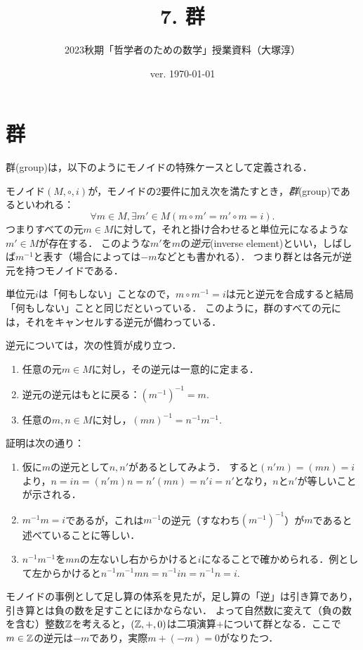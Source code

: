 \documentclass[11pt,a4paper]{jsarticle}
\begin{document}
\title{7. 群}
\author{2023秋期「哲学者のための数学」授業資料（大塚淳）}
\date{ver. \today}
\maketitle



\section{群}
群(group)は，以下のようにモノイドの特殊ケースとして定義される．
\begin{dfn}[群]
    モノイド$(M, \circ, i)$が，モノイドの2要件に加え次を満たすとき，\emph{群}(group)であるといわれる：
    \[ \forall m \in M, \exists m' \in M (m \circ m' = m' \circ m = i).\]
    つまりすべての元$m \in M$に対して，それと掛け合わせると単位元になるような$m' \in M$が存在する．
    このような$m'$を$m$の\emph{逆元}(inverse element)といい，しばしば$m^{-1}$と表す（場合によっては$-m$などとも書かれる）．
    つまり群とは各元が逆元を持つモノイドである．
\end{dfn}    

単位元$i$は「何もしない」ことなので，$m \circ m^{-1} = i$は元と逆元を合成すると結局「何もしない」ことと同じだといっている．
このように，群のすべての元には，それをキャンセルする逆元が備わっている．

逆元については，次の性質が成り立つ．
\begin{enumerate}
    \item 任意の元$m \in M$に対し，その逆元は一意的に定まる．
    \item 逆元の逆元はもとに戻る：$(m^{-1})^{-1}=m$.
    \item 任意の$m,n \in M$に対し，$(mn)^{-1}=n^{-1}m^{-1}$.
\end{enumerate}
証明は次の通り：
\begin{enumerate}
    \item 仮に$m$の逆元として$n, n'$があるとしてみよう．
    すると$(n'm)=(mn)=i$より，$n = in = (n'm)n = n'(mn) = n'i = n'$となり，$n$と$n'$が等しいことが示される．
    \item $m^{-1}m=i$であるが，これは$m^{-1}$の逆元（すなわち$(m^{-1})^{-1}$）が$m$であると述べていることに等しい．
    \item $n^{-1}m^{-1}$を$mn$の左ないし右からかけると$i$になることで確かめられる．例として左からかけると$n^{-1}m^{-1}mn = n^{-1} i n = n^{-1}n = i$.
\end{enumerate}


\begin{example}
    モノイドの事例として足し算の体系を見たが，足し算の「逆」は引き算であり，引き算とは負の数を足すことにほかならない．
    よって自然数に変えて（負の数を含む）整数$\mathbb{Z}$を考えると，$(\mathbb{Z}, +, 0)$は二項演算$+$について群となる．ここで$m \in \mathbb{Z}$の逆元は$-m$であり，実際$m + (-m) = 0$がなりたつ．
\end{example}
\end{document}

